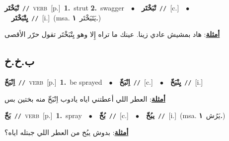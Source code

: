 \documentclass[10pt,a4paper,twoside]{article} %
\begin{document}
\begin{multicols}{2}
{\setlength\topsep{0pt}\textbf{\foreignlanguage{arabic}{تْبَخْتَر}}\ {\color{gray}\texttt{//}\color{black}}\ \textsc{verb}\ [p.]\ \textbf{1.}~strut  \textbf{2.}~swagger\ \ $\bullet$\ \ \setlength\topsep{0pt}\textbf{\foreignlanguage{arabic}{تْبَخْتَر}}\ {\color{gray}\texttt{//}\color{black}}\ [c.]\ \ $\bullet$\ \ \setlength\topsep{0pt}\textbf{\foreignlanguage{arabic}{يِتْبَخْتَر}}\ {\color{gray}\texttt{//}\color{black}}\ [i.]\ \color{gray}(msa. \foreignlanguage{arabic}{يَتَبَخْتَر}~\foreignlanguage{arabic}{\textbf{١.}})\color{black}\  \begin{flushright}\color{gray}\foreignlanguage{arabic}{\textbf{\underline{\foreignlanguage{arabic}{أمثلة}}}: هاد بمشيش عادي زينا. عينك ما تراه إِلا وهو يِتْبَخْتَر تقول حرّر الأقصى}\end{flushright}\color{black}} \vspace{2mm}

\vspace{-3mm}
\subsection*{\color{blue}\foreignlanguage{arabic}{ب.خ.خ}\color{blue}{}} 

{\setlength\topsep{0pt}\textbf{\foreignlanguage{arabic}{اِنْبَخّ}}\ {\color{gray}\texttt{//}\color{black}}\ \textsc{verb}\ [p.]\ \textbf{1.}~be sprayed\ \ $\bullet$\ \ \setlength\topsep{0pt}\textbf{\foreignlanguage{arabic}{اِنْبَخّ}}\ {\color{gray}\texttt{//}\color{black}}\ [c.]\ \ $\bullet$\ \ \setlength\topsep{0pt}\textbf{\foreignlanguage{arabic}{يِنْبَخّ}}\ {\color{gray}\texttt{//}\color{black}}\ [i.]\  \begin{flushright}\color{gray}\foreignlanguage{arabic}{\textbf{\underline{\foreignlanguage{arabic}{أمثلة}}}: العطر اللي أعطتني اياه يادوب اِنْبَخّ منه بختين بس}\end{flushright}\color{black}} \vspace{2mm}

{\setlength\topsep{0pt}\textbf{\foreignlanguage{arabic}{بَخّ}}\ {\color{gray}\texttt{//}\color{black}}\ \textsc{verb}\ [p.]\ \textbf{1.}~spray\ \ $\bullet$\ \ \setlength\topsep{0pt}\textbf{\foreignlanguage{arabic}{بُخّ}}\ {\color{gray}\texttt{//}\color{black}}\ [c.]\ \ $\bullet$\ \ \setlength\topsep{0pt}\textbf{\foreignlanguage{arabic}{يبُخّ}}\ {\color{gray}\texttt{//}\color{black}}\ [i.]\ \color{gray}(msa. \foreignlanguage{arabic}{يَرُش}~\foreignlanguage{arabic}{\textbf{١.}})\color{black}\  \begin{flushright}\color{gray}\foreignlanguage{arabic}{\textbf{\underline{\foreignlanguage{arabic}{أمثلة}}}: بدوش يبُخ من العطر اللي جبتله اياه؟}\end{flushright}\color{black}} \vspace{2mm}


\end{multicols}
\end{document}
